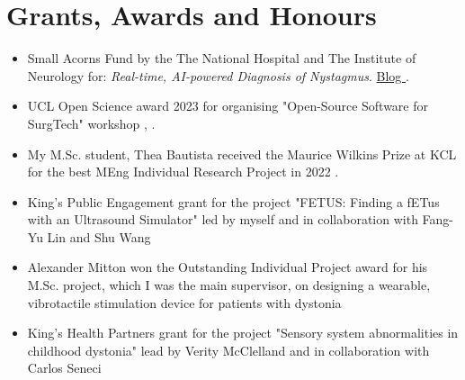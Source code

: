 \documentclass{mycv}
\begin{document}
\section{Grants, Awards and Honours}
\begin{itemize}

\item
Small Acorns Fund by the The National Hospital and The Institute of Neurology for: \textit{Real-time, AI-powered Diagnosis of Nystagmus}. 
\href{https://www.nationalbrainappeal.org/nystagmus-diagnosis-software/}{Blog \faExternalLink*}
.

\item UCL Open Science award 2023 for organising "Open-Source Software for SurgTech" workshop \href{https://blogs.ucl.ac.uk/open-access/2023/10/26/open-science-scholarship-awards-winners/}{\faExternalLink*}, \href{https://github.com/oss-for-surgtech}{\faGithub*}
.

\item My M.Sc. student, Thea Bautista received the Maurice Wilkins Prize at KCL for the best MEng Individual Research Project in 2022 \href{https://twitter.com/_mxochicale/status/1564571097932402688}{\faExternalLink*} .

\item King's Public Engagement grant for the project "FETUS: Finding a fETus with an Ultrasound Simulator" led by myself and in collaboration with Fang-Yu Lin and Shu Wang \href{https://cai4cai.ml/post/2021-01-07-miguelpegrant/}{\faExternalLink*} 

\item Alexander Mitton won the Outstanding Individual Project award for his M.Sc. project, which I was the main supervisor, on designing a wearable, vibrotactile stimulation device for patients with dystonia \href{https://www.kcl.ac.uk/news/mscmres-healthcare-technologies-award-student-prizes-for-outstanding-performance-and-contributions-to-student-life}{\faExternalLink*} 

\item King's Health Partners grant for the project "Sensory system abnormalities in childhood dystonia" lead by Verity McClelland and in collaboration with Carlos Seneci \href{https://kclpure.kcl.ac.uk/portal/en/persons/miguel-angel-perez-xochicale(cca72683-31b7-496a-8aeb-181fd9d6a8f3)/projects.html}{\faExternalLink*} 


\end{itemize}
\end{document}
